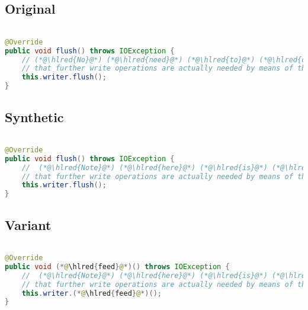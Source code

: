 \documentclass[11pt]{article}
\DeclareRobustCommand{\hlred}[1]{{\sethlcolor{YellowOrange}\hl{#1}}}
\begin{document}
  \subsection{Original}
  \begin{lstlisting}[language=java]

@Override
public void flush() throws IOException {
    // (*@\hlred{No}@*) (*@\hlred{need}@*) (*@\hlred{to}@*) (*@\hlred{control}@*) (*@\hlred{overflow}@*) (*@\hlred{here.}@*) (*@\hlred{The}@*) (*@\hlred{fact}@*) (*@\hlred{that}@*) (*@\hlred{this}@*) (*@\hlred{has}@*) (*@\hlred{overflow}@*) (*@\hlred{will}@*) (*@\hlred{be}@*) (*@\hlred{used}@*) (*@\hlred{as}@*) (*@\hlred{a}@*) (*@\hlred{flag}@*) to(*@\hlred{ determine}@*)
    // that further write operations are actually needed by means of the isOverflown() method.
    this.writer.flush();
}
  \end{lstlisting}
  \subsection{Synthetic}

  \begin{lstlisting}[language=java]

@Override
public void flush() throws IOException {
    //  (*@\hlred{Note}@*) (*@\hlred{here}@*) (*@\hlred{is}@*) (*@\hlred{an}@*) (*@\hlred{exception}@*) (*@\hlred{that}@*) (*@\hlred{may}@*) (*@\hlred{result}@*) (*@\hlred{when}@*) (*@\hlred{the}@*) (*@\hlred{writer}@*) (*@\hlred{checks}@*) (*@\hlred{whether}@*) (*@\hlred{there}@*) (*@\hlred{exist}@*) (*@\hlred{problems}@*) (*@\hlred{or}@*) (*@\hlred{otherwise}@*) to
    // that further write operations are actually needed by means of the isOverflown() method.
    this.writer.flush();
}
  \end{lstlisting}

  \subsection{Variant}

  \begin{lstlisting}[language=java]

@Override
public void (*@\hlred{feed}@*)() throws IOException {
    //  (*@\hlred{Note}@*) (*@\hlred{here}@*) (*@\hlred{is}@*) (*@\hlred{an}@*) (*@\hlred{exception}@*) (*@\hlred{because}@*) (*@\hlred{there}@*) (*@\hlred{isn't}@*) (*@\hlred{enough}@*) (*@\hlred{logic}@*) (*@\hlred{in}@*) (*@\hlred{it}@*) (*@\hlred{and}@*) (*@\hlred{thus}@*) (*@\hlred{no}@*) (*@\hlred{assumption}@*) (*@\hlred{made}@*) (*@\hlred{there}@*)
    // that further write operations are actually needed by means of the isOverflown() method.
    this.writer.(*@\hlred{feed}@*)();
}
  \end{lstlisting}
\end{document}
